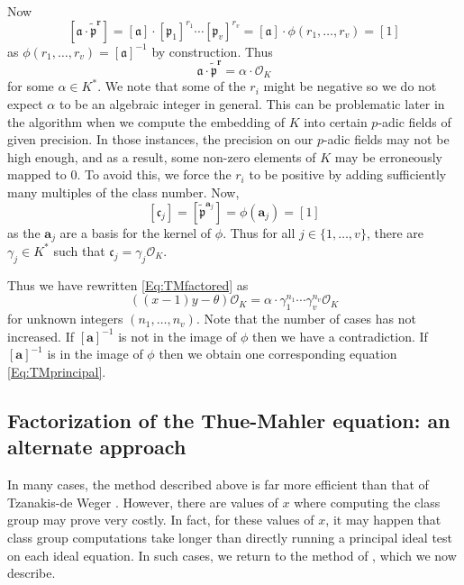 {Now
\[[\mathfrak{a} \cdot \tilde{\mathfrak{p}}^\mathbf{r}] 
	= [\mathfrak{a}] \cdot [\mathfrak{p}_1]^{r_1}\cdots [\mathfrak{p}_v]^{r_v} 
	= [\mathfrak{a}]\cdot \phi(r_1,\dotsc,r_v)=[1]\]
as $\phi(r_1,\dotsc,r_v)=[\mathfrak{a}]^{-1}$ by construction. Thus 
\[\mathfrak{a} \cdot \tilde{\mathfrak{p}}^\mathbf{r}=\alpha \cdot \mathcal{O}_K\]
for some $\alpha \in K^*$. We note that some of the $r_i$ might be negative so we do not expect $\alpha$ to be an algebraic integer in general. This can be problematic later in the algorithm when we compute the embedding of $K$ into certain $p$-adic fields of given precision. In those instances, the precision on our $p$-adic fields may not be high enough, and as a result, some non-zero elements of $K$ may be erroneously mapped to $0$. To avoid this, we force the $r_i$ to be positive by adding sufficiently many multiples of the class number. 
Now, 
\[[\mathfrak{c}_j] = [\tilde{\mathfrak{p}}^{\mathbf{a}_j}] = \phi(\mathbf{a}_j) = [1]\]
as the $\mathbf{a}_j$ are a basis for the kernel of $\phi$. Thus for all $j \in \{1, \dots, v\}$, there are $\gamma_j \in K^*$ such that $\mathfrak{c}_j=\gamma_j \mathcal{O}_K$. 

Thus we have rewritten \eqref{Eq:TMfactored} as
\begin{equation}\label{Eq:TMprincipal}
((x-1) y- \theta) \mathcal{O}_K=\alpha \cdot \gamma_1^{n_1} \cdots \gamma_v^{n_v} \mathcal{O}_K
\end{equation}
for unknown integers $(n_1, \dots, n_v)$. 
Note that the number of cases has not increased. If $[\mathbf{a}]^{-1}$ is not in the image of $\phi$ then we have a contradiction. If $[\mathbf{a}]^{-1}$ is in the image of $\phi$ then we obtain one corresponding equation \eqref{Eq:TMprincipal}.
\subsection{Factorization of the Thue-Mahler equation: an alternate approach}

In many cases, the method described above is far more efficient than that of Tzanakis-de Weger \cite{TW3}. However, there are values of $x$ where computing the class group may prove very costly. In fact, for these values of $x$, it may happen that class group computations  take longer than directly running a  principal ideal test on each ideal equation. In such cases, we return to the method of \cite{TW3}, which we now describe. 

}
